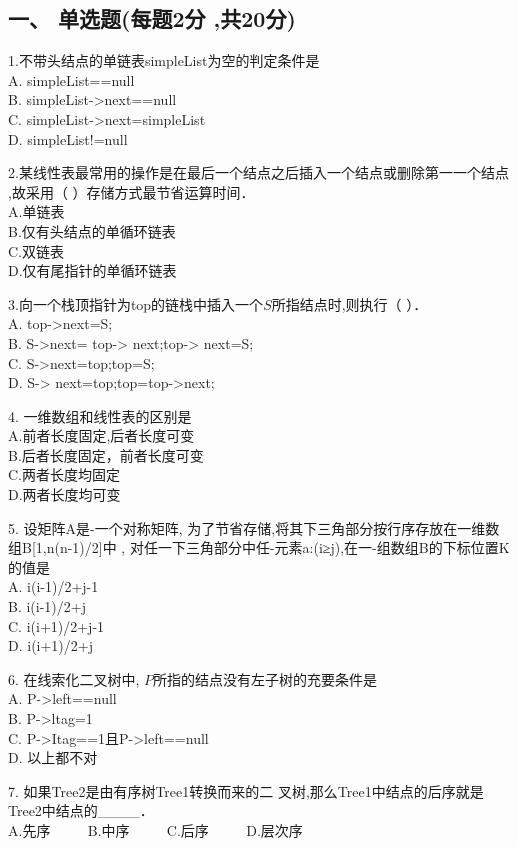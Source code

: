 
\subsection{一、 单选题(每题2分 ,共20分)}

1.不带头结点的单链表simpleList为空的判定条件是 \\
A. simpleList==null \\
B. simpleList->next==null \\
C. simpleList->next=simpleList \\
D. simpleList!=null

2.某线性表最常用的操作是在最后一个结点之后插入一个结点或删除第一一个结点 ,故采用（  ）存储方式最节省运算时间． \\
A.单链表 \\
B.仅有头结点的单循环链表 \\
C.双链表 \\
D.仅有尾指针的单循环链表

3.向一个栈顶指针为top的链栈中插入一个$S$所指结点时,则执行（    ）． \\
A. top->next=S; \\
B. S->next= top-> next;top-> next=S; \\
C. S->next=top;top=S; \\
D. S-> next=top;top=top->next;

4. 一维数组和线性表的区别是 \\
A.前者长度固定,后者长度可变 \\
B.后者长度固定，前者长度可变 \\
C.两者长度均固定 \\
D.两者长度均可变

5. 设矩阵A是-一个对称矩阵, 为了节省存储,将其下三角部分按行序存放在一维数组B[1,n(n-1)/2]中 , 对任一下三角部分中任-元素a:(i≥j),在一-组数组B的下标位置K的值是 \\
A. i(i-1)/2+j-1 \\
B. i(i-1)/2+j \\
C. i(i+1)/2+j-1 \\
D. i(i+1)/2+j

6. 在线索化二叉树中, $P$所指的结点没有左子树的充要条件是 \\
A. P->left==null \\
B. P->ltag=1 \\
C. P->Itag==1且P->left==null \\
D. 以上都不对

7. 如果Tree2是由有序树Tree1转换而来的二 叉树,那么Tree1中结点的后序就是Tree2中结点的____． \\
A.先序 $\qquad$ B.中序 $\qquad$ C.后序 $\qquad$ D.层次序

